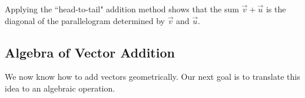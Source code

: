 \documentclass{ximera}
\begin{document}
Applying the ``head-to-tail" addition method shows that the sum $\vec{v}+\vec{u}$ is the diagonal of the parallelogram determined by $\vec{v}$ and $\vec{u}$.

\begin{center}
\end{center}





\subsection*{Algebra of Vector Addition}

We now know how to add vectors geometrically.  Our next goal is to translate this idea to an algebraic operation.  
\end{document}
